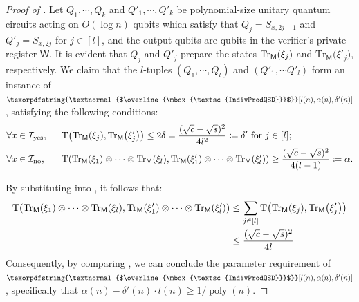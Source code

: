 \documentclass[10pt,a4paper]{article}
\numberwithin{equation}{section}
\numberwithin{figure}{section}
\newcommand{\textoverline}[1]{$\overline{\mbox{#1}}$}
\newcommand{\coIndivProdQSD}{\texorpdfstring{\textnormal{\textoverline{\textsc{IndivProdQSD}}}}\xspace}
\DeclarePairedDelimiter\rbra{\lparen}{\rparen}
\newcommand{\Tr}{\mathrm{Tr}}
\newcommand{\td}{\mathrm{T}}
\newcommand{\yes}{{\rm yes}}
\newcommand{\no}{{\rm no}}
\DeclareMathOperator\poly{poly}
\newcommand{\calI}{\mathcal{I}}
\newcommand{\sfM}{\mathsf{M}}
\newcommand{\sfW}{\mathsf{W}}
\begin{document}
\begin{proof}[Proof of ]
    Let $Q_1,\cdots,Q_k$ and $Q'_1,\cdots,Q'_k$ be polynomial-size unitary quantum circuits acting on $O(\log n)$ qubits which satisfy that $Q_j = S_{x,2j-1}$ and $Q'_j = S_{x,2j}$ for $j\in[l]$, and the output qubits are qubits in the verifier's private register $\sfW$. It is evident that $Q_j$ and $Q'_j$ prepare the states $\Tr_{\sfM}\rbra*{\xi_j}$ and $\Tr_{\sfM}\big(\xi'_j\big)$, respectively. We claim that the $l$-tuples $(Q_1,\cdots,Q_l)$ and $(Q'_1, \cdots Q'_l)$ form an instance of $\coIndivProdQSD[l(n),\alpha(n),\delta'(n)]$, satisfying the following conditions: 
    \begin{align}
        &\forall x \in \calI_\yes,& ~~ &\td\rbra*{\Tr_{\sfM}\rbra*{\xi_j}, \Tr_{\sfM}\rbra*{\xi'_j}} \leq 2\delta = \frac{(\sqrt{c}-\sqrt{s})^2}{4l^2} \coloneqq \delta'\text{ for } j \in [l]; \label{eq:QSZKLhard-yes-prob}\\
        &\forall x \in \calI_\no,& ~~ &\td\rbra*{\Tr_{\sfM}\rbra*{\xi_1} \otimes \cdots \otimes \Tr_{\sfM}\rbra*{\xi_l}, \Tr_{\sfM}\rbra*{\xi'_1} \otimes \cdots \otimes \Tr_{\sfM}\rbra*{\xi'_l}} \geq \frac{(\sqrt{c}-\sqrt{s})^2}{4(l-1)} \coloneqq \alpha. \label{eq:QSZKLhard-no-prob}
    \end{align}

    By substituting  into , it follows that: 
    \begin{equation}
        \label{eq:QSZKLhad-yes-prob-global}
        \begin{aligned}
             \td\rbra*{\Tr_{\sfM}\rbra*{\xi_1} \otimes \cdots \otimes \Tr_{\sfM}\rbra*{\xi_l}, \Tr_{\sfM}\rbra*{\xi'_1} \otimes \cdots \otimes \Tr_{\sfM}\rbra*{\xi'_l}} &\leq \sum_{j \in [l]} \td\rbra*{\Tr_{\sfM}\rbra*{\xi_j}, \Tr_{\sfM}\rbra*{\xi'_j}} \\
             &\leq \frac{(\sqrt{c}-\sqrt{s})^2}{4l}. 
        \end{aligned}
    \end{equation}
    Consequently, by comparing , we can conclude the parameter requirement of $\coIndivProdQSD[l(n),\alpha(n),\delta'(n)]$, specifically that $\alpha(n) - \delta'(n) \cdot l(n) \geq 1/\poly(n)$.


\end{proof}
\end{document}
